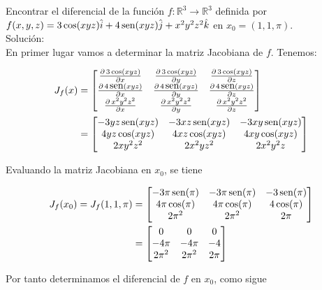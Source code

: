 \documentclass[letterpaper, 12pt]{article} %
\begin{document}
\newpage
\begin{example}
Encontrar el diferencial de la función $f : \mathbb{R}^{3} \longrightarrow \mathbb{R}^{3}$ definida por
$f(x,y,z) = 3\cos(xyz)\hat{i} + 4\mathop{\mbox{\normalfont sen}}\nolimits(xyz)\hat{j} + x^{2}y^{2}z^{2}\hat{k}$ en $x_{0} = (1,1,\pi)$.\\

{\sc Solución:}\\
En primer lugar vamos a determinar la matriz Jacobiana de $f$. Tenemos:


\begin{align*}
J_{f}(x) &=
\begin{bmatrix}
\frac{\partial \, 3\cos(xyz)}{\partial x} & \frac{\partial \, 3\cos(xyz)}{\partial y} & \frac{\partial \, 3\cos(xyz)}{\partial z}\\
\frac{\partial \, 4\mathop{\mbox{\normalfont sen}}\nolimits(xyz)}{\partial x} & \frac{\partial \, 4\mathop{\mbox{\normalfont sen}}\nolimits(xyz)}{\partial y} & \frac{\partial \, 4\mathop{\mbox{\normalfont sen}}\nolimits(xyz)}{\partial z}\\
\frac{\partial \, x^{2}y^{2}z^{2}}{\partial x} & \frac{\partial \, x^{2}y^{2}z^{2}}{\partial y} & \frac{\partial \, x^{2}y^{2}z^{2}}{\partial z}
\end{bmatrix}\\
 &=
\begin{bmatrix}
-3yz\mathop{\mbox{\normalfont sen}}\nolimits(xyz) & -3xz\mathop{\mbox{\normalfont sen}}\nolimits(xyz) & -3xy\mathop{\mbox{\normalfont sen}}\nolimits(xyz)\\
4yz\cos(xyz) & 4xz\cos(xyz) & 4xy\cos(xyz)\\
2xy^{2}z^{2} & 2x^{2}yz^{2} & 2x^{2}y^{2}z
\end{bmatrix}
\end{align*}

Evaluando la matriz Jacobiana en $x_{0}$, se tiene

\begin{align*}
J_{f}(x_{0}) = J_{f}(1,1,\pi) &=
\begin{bmatrix}
-3\pi\mathop{\mbox{\normalfont sen}}\nolimits(\pi) & -3\pi\mathop{\mbox{\normalfont sen}}\nolimits(\pi) & -3\mathop{\mbox{\normalfont sen}}\nolimits(\pi)\\
4\pi\cos(\pi) & 4\pi\cos(\pi) & 4\cos(\pi)\\
2\pi^{2} & 2\pi^{2} & 2\pi
\end{bmatrix}\\
&=
\begin{bmatrix}
0 & 0 & 0\\
-4\pi & -4\pi & -4\\
2\pi^{2} & 2\pi^{2} & 2\pi
\end{bmatrix}
\end{align*}

Por tanto determinamos el diferencial de $f$ en $x_{0}$, como sigue


\end{example}
\end{document}
